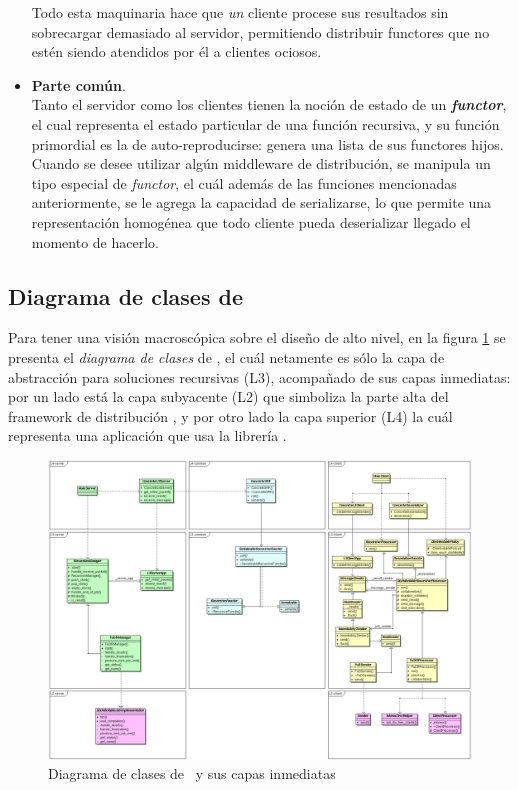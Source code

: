 \begin{itemize}
            Todo esta maquinaria hace que \textit{un} cliente procese sus resultados sin sobrecargar demasiado al servidor, permitiendo     
            distribuir functores que no estén siendo atendidos por él a clientes ociosos.
    \item   \textbf{Parte común}.\\
            Tanto el servidor como los clientes tienen la noción de estado de un \textbf{\textit{functor}}, el cual representa el estado
            particular de una función recursiva, y su función primordial es la de auto-reproducirse: genera una lista de sus functores
            hijos. Cuando se desee utilizar algún middleware de distribución, se manipula un tipo especial de \textit{functor}, el cuál
            además de las funciones mencionadas anteriormente, se le agrega la capacidad de serializarse, lo que permite una representación
            homogénea que todo cliente pueda deserializar llegado el momento de hacerlo.
\end{itemize}

\subsection{Diagrama de clases de \rc}

Para tener una visión macroscópica sobre el diseño de alto nivel, en la figura \ref{class_diagram} se presenta el \textit{diagrama de
clases} de \rc, el cuál netamente es sólo la capa de abstracción para soluciones recursivas (L3), acompañado de sus capas inmediatas: por un
lado está la capa subyacente (L2) que simboliza la parte alta del framework de distribución \fud, y por otro lado la capa superior (L4) la
cuál representa una aplicación que usa la librería \rc.

\begin{center}
    \begin{landscape}
        \begin{figure}[ht]
            \includegraphics[scale=.35]{images/class.png}
            \caption{Diagrama de clases de \rc \ y sus capas inmediatas}
            \label{class_diagram}
        \end{figure}
    \end{landscape}
\end{center}


